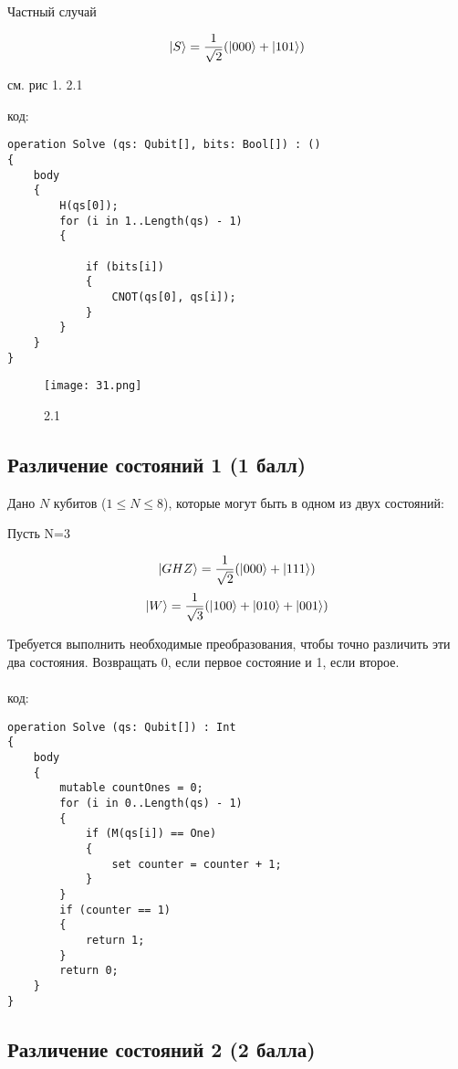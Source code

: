 \documentclass{article}
\begin{document}
Частный случай

$$\Ket{S} = \frac{1}{\sqrt2}(\Ket{000} +\Ket{101})$$



 см. рис 1. 2.1
 
код:
\begin{lstlisting}
operation Solve (qs: Qubit[], bits: Bool[]) : () 
{
    body 
    {
        H(qs[0]);  
        for (i in 1..Length(qs) - 1)
        {

            if (bits[i]) 
            {
                CNOT(qs[0], qs[i]);
            }
        }
    }
}

\end{lstlisting}

\begin{figure}[h]
\centering
\caption{2.1}
\texttt{[image: 31.png]}

\end{figure}

\subsection{Различение состояний 1 (1 балл)}

Дано $N$ кубитов ($1 \le N \le 8$), которые могут быть в одном из двух состояний:

Пусть N=3

$$\Ket{GHZ} = \frac{1}{\sqrt2}(\Ket{000} +\Ket{111})$$
$$\Ket{W} = \frac{1}{\sqrt 3}(\Ket{100}+\Ket{010} +\Ket{001})$$

Требуется выполнить необходимые преобразования, чтобы точно различить эти два состояния. Возвращать $0$, если первое состояние и 1, если второе. 
\\\\
код:
\begin{lstlisting}
operation Solve (qs: Qubit[]) : Int
{
    body 
    {
        mutable countOnes = 0;
        for (i in 0..Length(qs) - 1)
        {
            if (M(qs[i]) == One)
            {
                set counter = counter + 1;
            }
        }
        if (counter == 1)
        {
            return 1;
        }
        return 0;
    }
}

\end{lstlisting}










\subsection{Различение состояний 2 (2 балла)}
\end{document}
